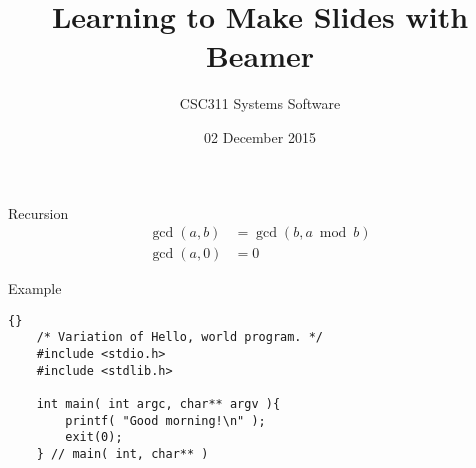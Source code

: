 \documentclass{beamer}
\title{Learning to Make Slides with Beamer}
\author{CSC311 Systems Software}
\institute{Cornell College}
\date{02 December 2015}
\begin{document}
\begin{frame}
  \titlepage
\end{frame}

\begin{frame}{Recursion}
\begin{align*}
  \gcd (a, b) & = \gcd( b, a \bmod b ) \\
  \gcd( a, 0 ) & = 0
  \end{align*}
\end{frame}

\begin{frame}[fragile]{Example}

  \begin{lstlisting}{}
    /* Variation of Hello, world program. */
    #include <stdio.h>
    #include <stdlib.h>

    int main( int argc, char** argv ){
        printf( "Good morning!\n" );
        exit(0);
    } // main( int, char** )
    \end{lstlisting}

\end{frame}
\end{document}
